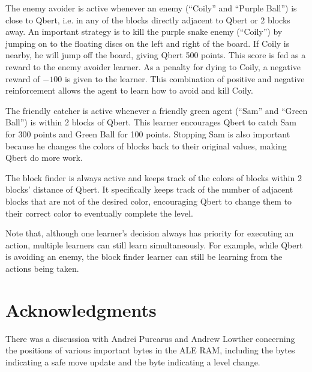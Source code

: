 \documentclass[a4paper,titlepage]{article}
\begin{document}
	The enemy avoider is active whenever an enemy (``Coily'' and ``Purple Ball'') is close to Qbert, i.e. in any of the blocks directly adjacent to Qbert or 2 blocks away. An important strategy is to kill the purple snake enemy (``Coily'') by jumping on to the floating discs on the left and right of the board. If Coily is nearby, he will jump off the board, giving Qbert 500 points. This score is fed as a reward to the enemy avoider learner. As a penalty for dying to Coily, a negative reward of $-100$ is given to the learner. This combination of positive and negative reinforcement allows the agent to learn how to avoid and kill Coily.
	
	The friendly catcher is active whenever a friendly green agent (``Sam'' and ``Green Ball'') is within 2 blocks of Qbert. This learner encourages Qbert to catch Sam for 300 points and Green Ball for 100 points. Stopping Sam is also important because he changes the colors of blocks back to their original values, making Qbert do more work.
	
	The block finder is always active and keeps track of the colors of blocks within 2 blocks' distance of Qbert. It specifically keeps track of the number of adjacent blocks that are not of the desired color, encouraging Qbert to change them to their correct color to eventually complete the level.
	
	Note that, although one learner's decision always has priority for executing an action, multiple learners can still learn simultaneously. For example, while Qbert is avoiding an enemy, the block finder learner can still be learning from the actions being taken.
	
	
	
	\section*{Acknowledgments}
	
	There was a discussion with Andrei Purcarus and Andrew Lowther concerning the positions of various important bytes in the ALE RAM, including the bytes indicating a safe move update and the byte indicating a level change.
	
	
	
	{}
	
\end{document}
